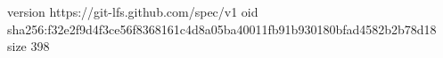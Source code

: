 version https://git-lfs.github.com/spec/v1
oid sha256:f32e2f9d4f3ce56f8368161c4d8a05ba40011fb91b930180bfad4582b2b78d18
size 398
